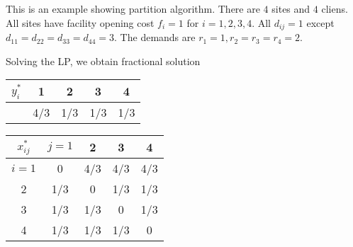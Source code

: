 \documentclass{article}
\begin{document}
This is an example showing partition algorithm. There are
$4$ sites and $4$ cliens. All sites have facility opening
cost $f_i=1$ for $i=1,2,3,4$. All $d_{ij}=1$ except $d_{11}
= d_{22} = d_{33} = d_{44} = 3$. The demands are $r_1=1,
r_2=r_3=r_4=2$.

Solving the LP, we obtain fractional solution
\begin{table}[ht,center]
  \begin{subtable}{0.5\textwidth}
  \centering
  \begin{tabular}{c | c c c c}
    $y_i^\ast$ & 1 & 2 & 3 & 4\\
    \hline
    & 4/3 & 1/3 & 1/3 & 1/3\\
  \end{tabular}
\end{subtable}
%
\begin{subtable}{0.5\textwidth}
  \centering
  \begin{tabular}{c | c c c c}
    $x_{ij}^\ast$ & $j=1$ & 2 & 3 & 4\\
    \hline
    $i=1$ & 0 & 4/3 & 4/3 & 4/3\\
    2 & 1/3 & 0 & 1/3 & 1/3\\
    3 & 1/3 & 1/3 & 0 & 1/3\\
    4 & 1/3 & 1/3 & 1/3 & 0\\
  \end{tabular}
\end{subtable}
\end{table}
\end{document}
